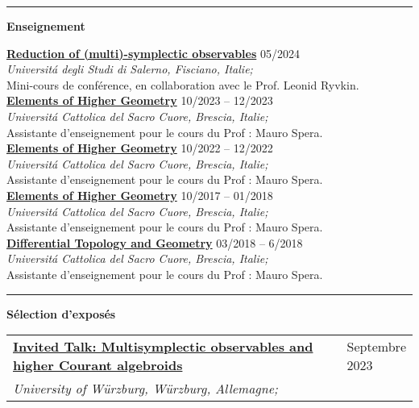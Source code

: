 \documentclass[a4paper]{article}
\newcommand{\block}[1]{\hrule \vspace{0.2cm} \textbf{\Large #1} \vspace{0.2cm}}
\newcommand{\longvoice}[8]{
    \begin{tabular}{p{0.83\linewidth} p{0.17\linewidth} }
        \textbf{\href{#3}{#2: #1}} & #4 
        \\ 
        \textit{#5, #6, #7;} & {\small\emph{#8}}
    \end{tabular}
    \vspace{.5em}
    }
\newcommand{\voice}[5]{\href{#4}{\textbf{#1}} \hfill #2 \\ \textit{#3} \\ {\small #5} \vspace{0.2cm} \\}
\begin{document}
    \block{Enseignement}

    
    \voice{Reduction of (multi)-symplectic observables}
        {05/2024}
        {Universit\'a degli Studi di Salerno, Fisciano, Italie;}
        {https://www.antoniomiti.it/teaching/Obs-Constraint-2024/}       
        {Mini-cours de conférence, en collaboration avec le Prof. Leonid Ryvkin.}
    \voice{Elements of Higher Geometry}
        {10/2023 -- 12/2023}
        {Universit\'a Cattolica del Sacro Cuore, Brescia, Italie;}
        {https://dmf.unicatt.it/miti/teaching/IstGeoSup-22-23/}       
        {Assistante d'enseignement pour le cours du Prof : Mauro Spera.}
    \voice{Elements of Higher Geometry}
        {10/2022 -- 12/2022}
        {Universit\'a Cattolica del Sacro Cuore, Brescia, Italie;}
        {https://dmf.unicatt.it/miti/teaching/IstGeoSup-22-23/}       
        {Assistante d'enseignement pour le cours du Prof : Mauro Spera.}
    \voice{Elements of Higher Geometry}
        {10/2017 -- 01/2018}
        {Universit\'a Cattolica del Sacro Cuore, Brescia, Italie;}
        {http://docenti.unicatt.it/web/html/index.html\#/programmi/BS/2D9B/75017/2017/21065/MIH341/ita}       
        {Assistante d'enseignement pour le cours du Prof : Mauro Spera.}
    \voice{Differential Topology and Geometry}
        {03/2018 -- 6/2018}
        {Universit\'a Cattolica del Sacro Cuore, Brescia, Italie;}
        {http://docenti.unicatt.it/web/html/index.html\#/programmi/BS/2D8B/75017/2017/21065/MGH344/ita}       
        {Assistante d'enseignement pour le cours du Prof : Mauro Spera.}

        




    \block{Sélection d'exposés}

    
    \longvoice{Multisymplectic observables and higher Courant algebroids}
        {Invited Talk}
        {https://www.mathematik.uni-wuerzburg.de/mathematicalphysics/forschung/veranstaltungen/workshops-und-konferenzen/single/news/poisson-geometry-higher-structures-and-deformation-theory/}
        {Septembre 2023}
        {University of Würzburg}
        {Würzburg}
        {Allemagne}
        {}
        
\end{document}

